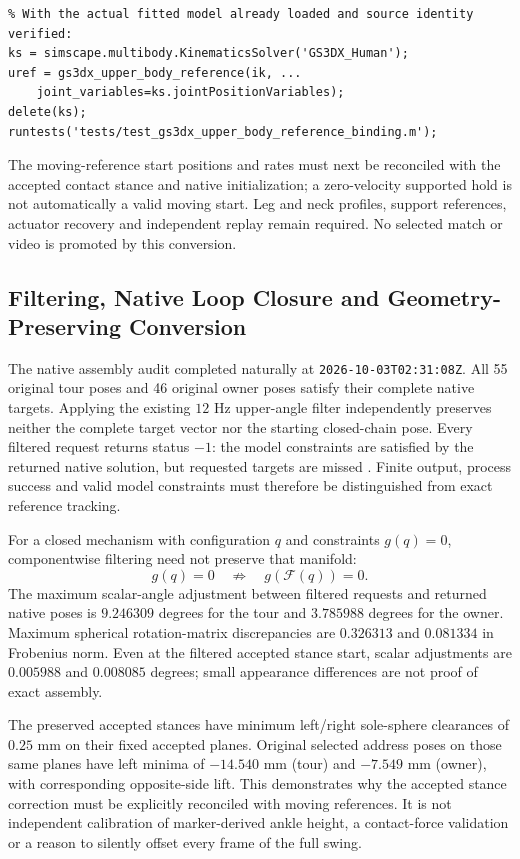 \documentclass[11pt,a4paper]{article}
\begin{document}
\begin{verbatim}
% With the actual fitted model already loaded and source identity verified:
ks = simscape.multibody.KinematicsSolver('GS3DX_Human');
uref = gs3dx_upper_body_reference(ik, ...
    joint_variables=ks.jointPositionVariables);
delete(ks);
runtests('tests/test_gs3dx_upper_body_reference_binding.m');
\end{verbatim}
The moving-reference start positions and rates must next be reconciled with
the accepted contact stance and native initialization; a zero-velocity
supported hold is not automatically a valid moving start. Leg and neck
profiles, support references, actuator recovery and independent replay
remain required. No selected match or video is promoted by this conversion.


\subsection{Filtering, Native Loop Closure and Geometry-Preserving Conversion}
\label{sec:reference-loop-closure}
The native assembly audit completed naturally at
\texttt{2026-10-03T02:31:08Z}. All 55 original tour poses and 46 original
owner poses satisfy their complete native targets. Applying the existing
$12$ Hz upper-angle filter independently preserves neither the complete
target vector nor the starting closed-chain pose. Every filtered request
returns status $-1$: the model constraints are satisfied by the returned
native solution, but requested targets are missed \cite{MathWorksSolve}.
Finite output, process success and valid model constraints must therefore
be distinguished from exact reference tracking.

For a closed mechanism with configuration $q$ and constraints $g(q)=0$,
componentwise filtering need not preserve that manifold:
\[
 g(q)=0 \quad\not\Rightarrow\quad g(\mathcal F(q))=0.
\]
The maximum scalar-angle adjustment between filtered requests and returned
native poses is $9.246309$ degrees for the tour and $3.785988$ degrees for
the owner. Maximum spherical rotation-matrix discrepancies are
$0.326313$ and $0.081334$ in Frobenius norm. Even at the filtered accepted
stance start, scalar adjustments are $0.005988$ and $0.008085$ degrees;
small appearance differences are not proof of exact assembly.

The preserved accepted stances have minimum left/right sole-sphere
clearances of $0.25$ mm on their fixed accepted planes. Original selected
address poses on those same planes have left minima of $-14.540$ mm
(tour) and $-7.549$ mm (owner), with corresponding opposite-side lift.
This demonstrates why the accepted stance correction must be explicitly
reconciled with moving references. It is not independent calibration of
marker-derived ankle height, a contact-force validation or a reason to
silently offset every frame of the full swing.
\end{document}

